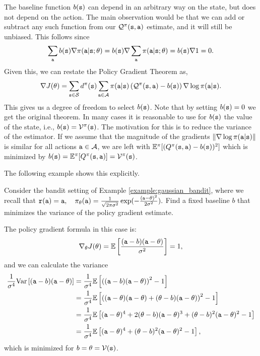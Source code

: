 The baseline function $b({\tt s})$ can depend in an arbitrary way on
the state, but does not depend on the action. The main observation
would be that we can add or subtract any such function from our
$\mathcal{Q}^\pi
({\tt s},{\tt a})$ estimate, and it will still be unbiased. This follows since
\begin{equation}\label{eq:no_bias_trick}
\sum_{\tt a} b({\tt s}) \nabla
\pi({\tt a}|{\tt s};\theta)=b({\tt s})\nabla \sum_{\tt a}
\pi({\tt a}|{\tt s};\theta)=b({\tt s})\nabla 1=0.
\end{equation}
Given this, we can restate the Policy Gradient Theorem as,
\[
\nabla J(\theta) = \sum_{{\tt s} \in \mathcal{S}} d^{\pi}({\tt s}) \sum_{{\tt a}\in
\mathcal{A}} \pi({\tt a}|{\tt s}) \left(\mathcal{Q}^\pi
({\tt s},{\tt a}) - b({\tt s})\right)\nabla \log \pi({\tt a}|{\tt s}).
\]
This gives us a degree of freedom to select $b({\tt s})$. Note that
by setting $b({\tt s})=0$ we get the original theorem. In many cases
it is reasonable to use for $b({\tt s})$ the value of the state,
i.e., $b({\tt s})=\mathcal{V}^\pi({\tt s})$. The motivation for this is
to reduce the variance of the estimator. If we assume that the
magnitude of the gradients $\|\nabla
\log \pi({\tt a}|{\tt s})\|$ is similar for all actions
${\tt a}\in \mathcal{A}$, we are left with $\mathbb{E}^\pi
[(Q^\pi({\tt s},{\tt a})-b({\tt s}))^2]$ which is minimized by
$b({\tt s})=\mathbb{E}^\pi[Q^\pi({\tt s},{\tt a})]=\mathcal{V}^\pi({\tt s})$.

The following example shows this explicitly.
\begin{example}
    Consider the bandit setting of Example \ref{example:gaussian_bandit}, where we recall that
$        {\tt r}({\tt a}) = {\tt a}, \quad
        \pi_\theta({\tt a}) = \frac{1}{\sqrt{2 \pi \sigma^2}} \exp (- \frac{({\tt a} - \theta)^2}{2 \sigma^2}).$
Find a fixed baseline $b$ that minimizes the variance of the policy gradient estimate.

The policy gradient formula in this case is:
\begin{equation*}
        \nabla_\theta J(\theta) = \mathbb{E} \left[\frac{({\tt a}-b)({\tt a} - \theta)}{\sigma^2}\right] = 1, 
\end{equation*}
and we can calculate the variance
\begin{equation*}
\begin{split}
        \frac{1}{\sigma^4}\textrm{Var}\left[({\tt a}-b)({\tt a} - \theta)\right]  
        &=\frac{1}{\sigma^4}\mathbb{E}\left[\left(({\tt a}-b)({\tt a} - \theta)\right)^2 - 1\right] \\
        &=\frac{1}{\sigma^4}\mathbb{E}\left[\left(({\tt a}-\theta)({\tt a} - \theta) + (\theta-b)({\tt a} - \theta)\right)^2 - 1\right] \\
        &=\frac{1}{\sigma^4}\mathbb{E}\left[({\tt a}-\theta)^4 + 2(\theta-b)({\tt a} - \theta)^3 + (\theta-b)^2({\tt a} - \theta)^2 - 1\right] \\
        &=\frac{1}{\sigma^4}\mathbb{E}\left[({\tt a}-\theta)^4 + (\theta-b)^2({\tt a} - \theta)^2 - 1\right],
\end{split}
\end{equation*}
which is minimized for $b=\theta = \mathcal{V}({\tt s})$.
\end{example}


